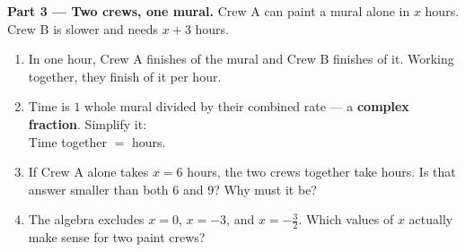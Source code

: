 \documentclass[10pt]{article}
\begin{document}
\begin{tcolorbox}[colback=white, colframe=black!40, title=\textbf{Tier E --- Extension},
    fonttitle=\bfseries, arc=1.5mm, left=3mm, right=3mm, top=2mm, bottom=2mm, breakable]
\vspace{5pt}
\textbf{Part 3 --- Two crews, one mural.} Crew A can paint a mural alone in $x$ hours. Crew B is slower
and needs $x+3$ hours.
\begin{enumerate}[label=(\alph*), leftmargin=1.9em, itemsep=6pt]
  \item In one hour, Crew A finishes \blank{1.0cm} of the mural and Crew B finishes \blank{1.4cm} of
        it. Working together, they finish \blank{2.6cm} of it per hour.
  \item Time is $1$ whole mural divided by their combined rate --- a \textbf{complex fraction}.
        Simplify it: \\[3pt]
        Time together $=$ \blank{3.0cm} hours.
  \item If Crew A alone takes $x=6$ hours, the two crews together take \blank{1.6cm} hours. Is that
        answer smaller than both $6$ and $9$? \blank{1.0cm} Why must it be? \blank{4.0cm}
  \item The algebra excludes $x=0$, $x=-3$, and $x=-\tfrac32$. Which values of $x$ actually make sense
        for two paint crews? \blank{3.0cm}
\end{enumerate}
\end{tcolorbox}
\end{document}
